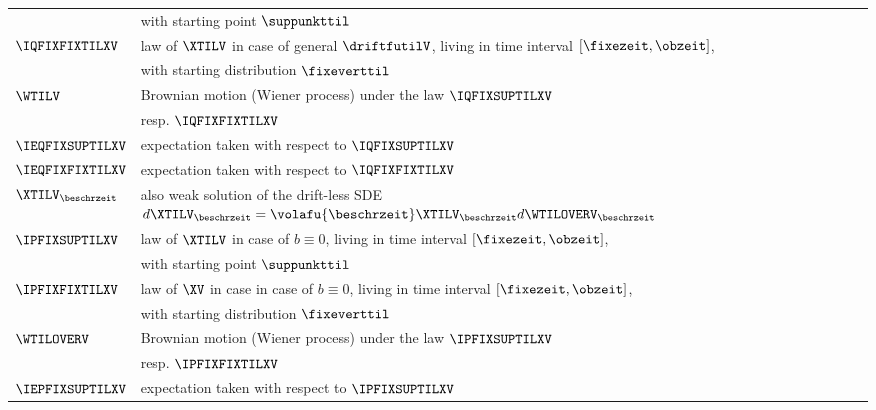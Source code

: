 \begin{longtable}{ll}
\\
\hspace{-0.33cm} $\ $ & with starting point $\suppunkttil$ 
\\
\hspace{-0.33cm} $\IQFIXFIXTILXV$ & law of $\XTILV$ in case of general $\driftfutilV$, living in time interval $[\fixezeit,\obzeit]$, 
\\
\hspace{-0.33cm} $\ $ & with starting distribution $\fixeverttil$ 
\\
\hspace{-0.33cm} $\WTILV$ & Brownian motion (Wiener process) under the law $\IQFIXSUPTILXV$ 
\\
\hspace{-0.33cm} $\ $ & resp. $\IQFIXFIXTILXV$ 
\\
\hspace{-0.33cm} $\IEQFIXSUPTILXV$ & expectation taken with respect to  $\IQFIXSUPTILXV$ 
\\
\hspace{-0.33cm} $\IEQFIXFIXTILXV$ & expectation taken with respect to  $\IQFIXFIXTILXV$ 
\\
\hspace{-0.33cm} $\XTILV_{\beschrzeit}$ & also weak solution of the drift-less
SDE $d\XTILV_{\beschrzeit} =  \volafu{{\beschrzeit}} \XTILV_{\beschrzeit} d\WTILOVERV_{\beschrzeit} $    
\\
\hspace{-0.33cm} $\IPFIXSUPTILXV$ & law of $\XTILV$ in case of $b \equiv 0$, living in time interval $[\fixezeit,\obzeit]$, 
\\
\hspace{-0.33cm} $\ $ & with starting point $\suppunkttil$ 
\\
\hspace{-0.33cm} $\IPFIXFIXTILXV$ & law of $\XV$ in case in case of $b \equiv 0$, living in time interval $[\fixezeit,\obzeit]$, 
\\
\hspace{-0.33cm} $\ $ & with starting distribution $\fixeverttil$ 
\\
\hspace{-0.33cm} $\WTILOVERV$ & Brownian motion (Wiener process) under the law $\IPFIXSUPTILXV$ 
\\
\hspace{-0.33cm} $\ $ & resp. $\IPFIXFIXTILXV$ 
\\
\hspace{-0.33cm} $\IEPFIXSUPTILXV$ & expectation taken with respect to  $\IPFIXSUPTILXV$ 

\end{longtable}
